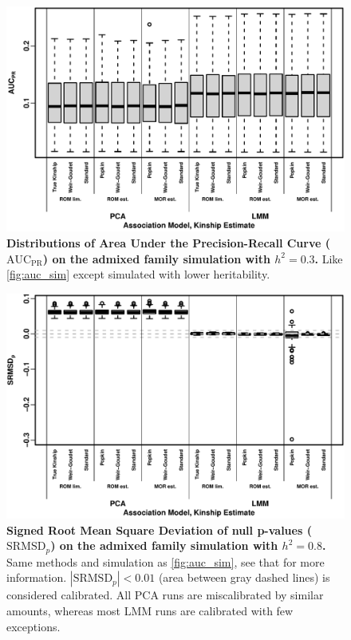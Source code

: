 \documentclass[11pt]{article}
\newcommand{\rmsd}{\text{SRMSD}_p}
\newcommand{\auc}{\text{AUC}_\text{PR}}
\begin{document}
\begin{figure}[bp!]
  \centering
  \includegraphics[width=\textwidth]{sim-admix-n1000-m100000-k3-f0.3-s0.5-g20/h-0.3/auc.pdf}
  \caption{
    {\bf Distributions of Area Under the Precision-Recall Curve ($\auc$) on the admixed family simulation with $h^2=0.3$.}
    Like \cref{fig:auc_sim} except simulated with lower heritability.
  }
  \label{fig:auc_sim-h3}
\end{figure}

\begin{figure}[hp!]
  \centering
  \includegraphics[width=\textwidth]{sim-admix-n1000-m100000-k3-f0.3-s0.5-mc100-h0.8-g20-fes/rmsd.pdf}
  \caption{
    {\bf Signed Root Mean Square Deviation of null p-values ($\rmsd$) on the admixed family simulation with $h^2=0.8$.}
    Same methods and simulation as \cref{fig:auc_sim}, see that for more information.
    $|\rmsd| < 0.01$ (area between gray dashed lines) is considered calibrated.
    All PCA runs are miscalibrated by similar amounts, whereas most LMM runs are calibrated with few exceptions.
    }
  \label{fig:rmsd_sim}
\end{figure}
\end{document}
